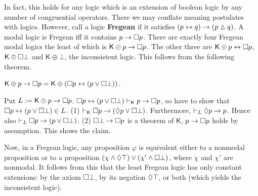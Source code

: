 In fact, this holds for any logic which is an extension of boolean
logic by any number of congruential operators.
There we may conflate meaning postulates with logics. However,
call a logic \textbf{Fregean} if it satisfies
$(p \leftrightarrow q) \rightarrow (p  \vartriangle q)$. A modal logic is Fregean
iff it contains $p \rightarrow \square p$. There are exactly
four Fregean modal logics the least of which is
$\mathsf{K} \oplus p \rightarrow \square p$. The other three are
$\mathsf{K} \oplus p \leftrightarrow \square p$, $\mathsf{K} \oplus
\square \bot$ and $\mathsf{K} \oplus \bot$, the inconsistent
logic. This follows from the following theorem.
\begin{prop}
$\mathsf{K} \oplus p \rightarrow \square p = \mathsf{K} \oplus
(\square p \leftrightarrow (p \vee \square \bot))$.
\end{prop}
\proofbeg
Put $L := \mathsf{K} \oplus p \rightarrow \square p$. $\square p \leftrightarrow (p \vee \square \bot) 
\vdash_{\mathsf{K}} p \rightarrow \square p$, so have to show that $\qu p \dpf (p %
\oder \qu \bot) \in L$. (1) $\vdash_{\mathsf{K}} \square p \rightarrow (\lozenge p \vee \square \bot)$. 
Furthermore, $\vdash_{L} \lozenge p \rightarrow p$. Hence also $\vdash_L 
\square p \rightarrow (p \vee \square \bot)$. (2) $\square \bot \rightarrow \square p$ is a theorem 
of $\mathsf{K}$, $p \rightarrow \square p$ holds by assumption. This shows the claim.
\proofend

Now, in a Fregean logic, any proposition $\varphi$ is equivalent
either to a nonmodal proposition or to a proposition
$(\chi \wedge \lozenge \top) \vee (\chi' \wedge \square \bot)$,
where $\chi$ and $\chi'$ are nonmodal. It follows from this that
the least Fregean logic has only constant extensions: by the axiom
$\square \bot$, by its negation $\lozenge \top$, or both (which yields the
inconsistent logic).

